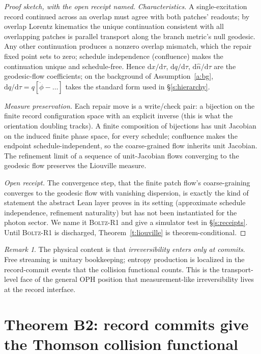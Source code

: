 \documentclass[11pt]{article}
\theoremstyle{remark}
\newtheorem{remark}[theorem]{Remark}
\newcommand{\Dd}{\mathrm{d}}
\begin{document}
\begin{proof}[Proof sketch, with the open receipt named]
\emph{Characteristics.} A single-excitation record continued across an
overlap must agree with both patches' readouts; by overlap Lorentz kinematics
the unique continuation consistent with all overlapping patches is parallel
transport along the branch metric's null geodesic. Any other continuation
produces a nonzero overlap mismatch, which the repair fixed point sets to
zero; schedule independence (confluence) makes the continuation unique and
schedule-free. Hence $\Dd x/\Dd\tau$, $\Dd q/\Dd\tau$, $\Dd\hat n/\Dd\tau$
are the geodesic-flow coefficients; on the background of
Assumption~\ref{a:bg}, $\Dd q/\Dd\tau=q[\dot\phi-\ldots]$ takes the standard
form used in \S\ref{s:hierarchy}.

\emph{Measure preservation.} Each repair move is a write/check pair: a
bijection on the finite record configuration space with an explicit inverse
(this is what the orientation doubling tracks). A finite composition of
bijections has unit Jacobian on the induced finite phase space, for every
schedule; confluence makes the endpoint schedule-independent, so the
coarse-grained flow inherits unit Jacobian. The refinement limit of a
sequence of unit-Jacobian flows converging to the geodesic flow preserves the
Liouville measure.

\emph{Open receipt.} The convergence step, that the finite patch flow's
coarse-graining converges to the geodesic flow with vanishing dispersion,
is exactly the kind of statement the abstract Lean layer proves in its
setting (approximate schedule independence, refinement naturality) but has
not been instantiated for the photon sector. We name it \textsc{Boltz-R1}
and give a simulator test in \S\ref{s:receipts}. Until \textsc{Boltz-R1} is
discharged, Theorem~\ref{t:liouville} is theorem-conditional.
\end{proof}

\begin{remark}
The physical content is that \emph{irreversibility enters only at commits}.
Free streaming is unitary bookkeeping; entropy production is localized in the
record-commit events that the collision functional counts. This is the
transport-level face of the general OPH position that measurement-like
irreversibility lives at the record interface.
\end{remark}

\section{Theorem B2: record commits give the Thomson collision functional}
\end{document}
